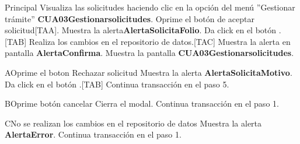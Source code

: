 \begin{UCtrayectoria}{Principal}
  \UCpaso[\UCactor] Visualiza las solicitudes haciendo clic en la opción del menú ''Gestionar trámite'' {\bf CUA03Gestionarsolicitudes}.
  \UCpaso [\UCactor] Oprime el botón de aceptar solicitud[TAA].
	\UCpaso Muestra la alerta{\bf AlertaSolicitaFolio}.
  \UCpaso [\UCactor] Da click en el botón .[TAB]
	\UCpaso Realiza los cambios en el repositorio de datos.[TAC]
	\UCpaso Muestra la alerta en pantalla {\bf AlertaConfirma}.
	\UCpaso Muestra la pantalla {\bf CUA03Gestionarsolicitudes}.
\end{UCtrayectoria}

\begin{UCtrayectoriaA}{A}{Oprime el boton Rechazar solicitud} 
	\UCpaso Muestra la alerta {\bf AlertaSolicitaMotivo}.
  \UCpaso [\UCactor] Da click en el botón .[TAB]
	\UCpaso Continua transacción en el paso 5.
\end{UCtrayectoriaA}

\begin{UCtrayectoriaA}{B}{Oprime botón cancelar} 
  \UCpaso Cierra el modal.
  \UCpaso Continua transacción en el paso 1.
\end{UCtrayectoriaA}

\begin{UCtrayectoriaA}{C}{No se realizan los cambios en el repositorio de datos} 
  \UCpaso  Muestra la alerta {\bf AlertaError}.
  \UCpaso Continua transacción en el paso 1.
\end{UCtrayectoriaA}

